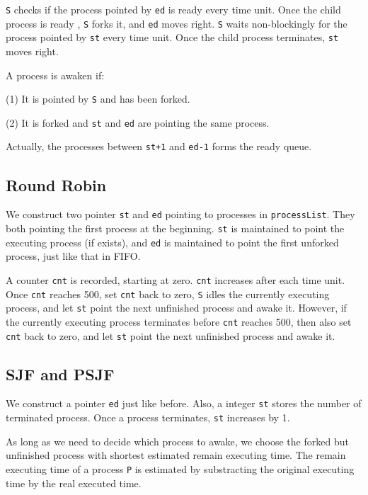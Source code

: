 \documentclass{article}
\begin{document}
        {\tt S} checks if the process pointed by {\tt ed} is ready every time unit. Once the child process is ready , {\tt S} forks it, and {\tt ed} moves right. {\tt S} waits non-blockingly for the process pointed by {\tt st} every time unit. Once the child process terminates, {\tt st} moves right.

        A process is awaken if: 

        (1) It is pointed by {\tt S} and has been forked.

        (2) It is forked and {\tt st} and {\tt ed} are pointing the same process.

        Actually, the processes between {\tt st+1} and {\tt ed-1} forms the ready queue.

    \subsection{Round Robin}
        We construct two pointer {\tt st} and {\tt ed} pointing to processes in {\tt processList}. They both pointing the first process at the beginning. {\tt st} is maintained to point the executing process (if exists), and {\tt ed} is maintained to point the first unforked process, just like that in FIFO.

        A counter {\tt cnt} is recorded, starting at zero. {\tt cnt} increases after each time unit. Once {\tt cnt} reaches 500, set {\tt cnt} back to zero, {\tt S} idles the currently executing process, and let {\tt st} point the next unfinished process and awake it. However, if the currently executing process terminates before {\tt cnt} reaches 500, then also set {\tt cnt} back to zero, and let {\tt st} point the next unfinished process and awake it.

    \subsection{SJF and PSJF}
        We construct a pointer {\tt ed} just like before. Also, a integer {\tt st} stores the number of terminated process. Once a process terminates, {\tt st} increases by 1.

        As long as we need to decide which process to awake, we choose the forked but unfinished process with shortest estimated remain executing time. The remain executing time of a process {\tt P} is estimated by substracting the original executing time by the real executed time.
        
\end{document}
